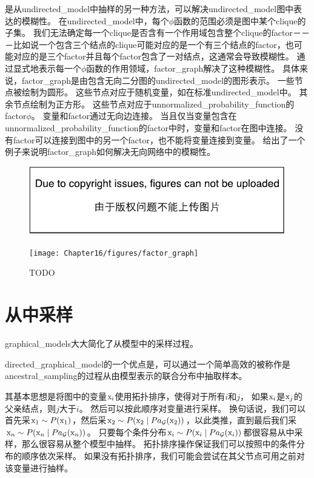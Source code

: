 是从\gls{undirected_model}中抽样的另一种方法，可以解决\gls{undirected_model}图中表达的模糊性。
在\gls{undirected_model}中，每个$\phi$函数的范围必须是图中某个\gls{clique}的子集。
我们无法确定每一个\gls{clique}是否含有一个作用域包含整个\gls{clique}的\gls{factor}－－－比如说一个包含三个结点的\gls{clique}可能对应的是一个有三个结点的\gls{factor}，也可能对应的是三个\gls{factor}并且每个\gls{factor}包含了一对结点，这通常会导致模糊性。
通过显式地表示每一个$\phi$函数的作用领域，\gls{factor_graph}解决了这种模糊性。
具体来说，\gls{factor_graph}是由包含无向二分图的\gls{undirected_model}的图形表示。
一些节点被绘制为圆形。 
这些节点对应于随机变量，如在标准\gls{undirected_model}中。
其余节点绘制为正方形。
这些节点对应于\gls{unnormalized_probability_function}的\gls{factor}$\phi$。
变量和\gls{factor}通过无向边连接。
当且仅当变量包含在\gls{unnormalized_probability_function}的\gls{factor}中时，变量和\gls{factor}在图中连接。
没有\gls{factor}可以连接到图中的另一个\gls{factor}，也不能将变量连接到变量。
给出了一个例子来说明\gls{factor_graph}如何解决无向网络中的模糊性。


\begin{figure}[!htb]
\ifOpenSource
\centerline{\includegraphics{figure.pdf}}
\else
	\centerline{\texttt{[image: Chapter16/figures/factor\_graph]}}	
\fi
	\caption{TODO}
	\label{fig:factor_graph}
\end{figure}


\section{从中采样}
\label{sec:sampling_from_graphical_models}

\gls{graphical_models}大大简化了从模型中的采样过程。


\gls{directed_graphical_model}的一个优点是，可以通过一个简单高效的被称作是\gls{ancestral_sampling}的过程从由模型表示的联合分布中抽取样本。


其基本思想是将图中的变量$\mathrm{x}_i$使用拓扑排序，使得对于所有$i$和$j$，
如果$\mathrm{x}_i$是$\mathrm{x}_j$的父亲结点，则$j$大于$i$。
然后可以按此顺序对变量进行采样。
换句话说，我们可以首先采$\mathrm{x}_1\sim P(\mathrm{x}_1)$，然后采$\mathrm{x}_2\sim P(\mathrm{x}_2\mid Pa_{\mathcal{G}}(\mathrm{x}_2))$，以此类推，直到最后我们采$\mathrm{x}_n\sim P(\mathrm{x}_n\mid Pa_{\mathcal{G}}(\mathrm{x}_n))$。
只要每个条件分布$\mathrm{x}_i\sim P(\mathrm{x}_i\mid Pa_{\mathcal{G}}(\mathrm{x}_i))$都很容易从中采样，那么很容易从整个模型中抽样。
拓扑排序操作保证我们可以按照中的条件分布的顺序依次采样。
如果没有拓扑排序，我们可能会尝试在其父节点可用之前对该变量进行抽样。


